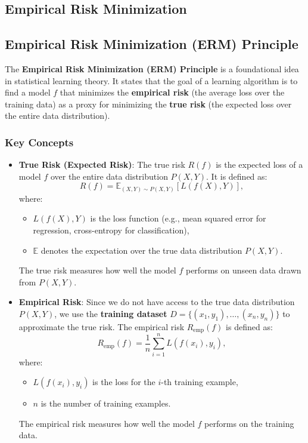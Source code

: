 \begin{notechapter}
\chapter{Empirical Risk Minimization}\label{ch:empirical-risk-minimization}

\section{Empirical Risk Minimization (ERM) Principle}

The \textbf{Empirical Risk Minimization (ERM) Principle} is a foundational idea in statistical learning theory. It states that the goal of a learning algorithm is to find a model \( f \) that minimizes the \textbf{empirical risk} (the average loss over the training data) as a proxy for minimizing the \textbf{true risk} (the expected loss over the entire data distribution).

\subsection{Key Concepts}

\begin{itemize}
    \item \textbf{True Risk (Expected Risk)}:
      The true risk \( R(f) \) is the expected loss of a model \( f \) over the entire data distribution \( P(X, Y) \). It is defined as:
      \[
      R(f) = \mathbb{E}_{(X,Y) \sim P(X,Y)}[L(f(X), Y)],
      \]
      where:
      \begin{itemize}
          \item \( L(f(X), Y) \) is the loss function (e.g., mean squared error for regression, cross-entropy for classification),
          \item \( \mathbb{E} \) denotes the expectation over the true data distribution \( P(X, Y) \).
      \end{itemize}
      The true risk measures how well the model \( f \) performs on unseen data drawn from \( P(X, Y) \).

    \item \textbf{Empirical Risk}:
      Since we do not have access to the true data distribution \( P(X, Y) \), we use the \textbf{training dataset} \( D = \{(x_1, y_1), \dots, (x_n, y_n)\} \) to approximate the true risk. The empirical risk \( R_{\text{emp}}(f) \) is defined as:
      \[
      R_{\text{emp}}(f) = \frac{1}{n} \sum_{i=1}^n L(f(x_i), y_i),
      \]
      where:
      \begin{itemize}
          \item \( L(f(x_i), y_i) \) is the loss for the \( i \)-th training example,
          \item \( n \) is the number of training examples.
      \end{itemize}
      The empirical risk measures how well the model \( f \) performs on the training data.


\end{itemize}
\end{notechapter}
